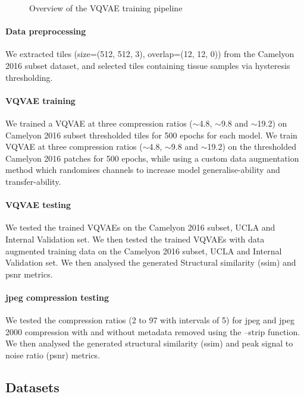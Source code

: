 \documentclass[review]{elsarticle}
\begin{document}
\begin{figure}
\caption{Overview of the VQVAE training pipeline}
\end{figure}

\paragraph{Data preprocessing}
We extracted tiles (size=(512, 512, 3), overlap=(12, 12, 0)) from the Camelyon 2016 subset dataset, and selected tiles containing tissue samples via hysteresis thresholding.

\paragraph{VQVAE training}
We trained a VQVAE at three compression ratios ($\sim$4.8, $\sim$9.8 and $\sim$19.2) on Camelyon 2016 subset thresholded tiles for 500 epochs for each model. We train VQVAE at three compression ratios ($\sim$4.8, $\sim$9.8 and $\sim$19.2) on the thresholded Camelyon 2016 patches for 500 epochs, while using a custom data augmentation method which randomises channels to increase model generalise-ability and transfer-ability.

\paragraph{VQVAE testing}
We tested the trained VQVAEs on the Camelyon 2016 subset, UCLA and Internal Validation set. We then tested the trained VQVAEs with data augmented training data on the Camelyon 2016 subset, UCLA and Internal Validation set. We then analysed the generated Structural similarity (\gls{ssim}) and \gls{psnr} metrics.

\paragraph{\gls{jpeg} compression testing}
We tested the compression ratios (2 to 97 with intervals of 5) for \gls{jpeg} and \gls{jpeg} 2000 compression with and without metadata removed using the --strip function. We then analysed the generated structural similarity (\gls{ssim}) and peak signal to noise ratio (\gls{psnr}) metrics.

\subsection{Datasets}
\end{document}
